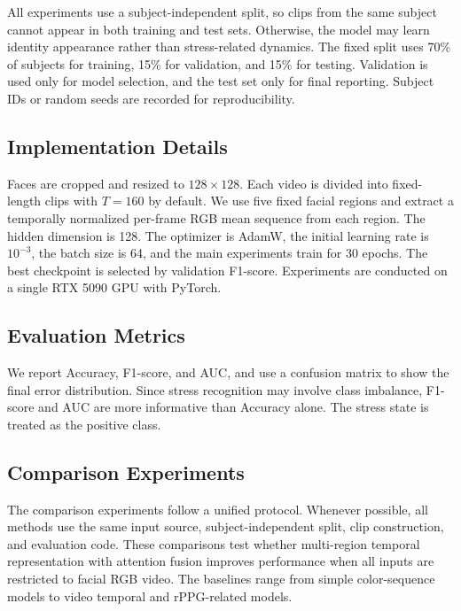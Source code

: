 \documentclass[runningheads]{llncs}
\begin{document}
All experiments use a subject-independent split, so clips from the same subject cannot appear in both training and test sets. Otherwise, the model may learn identity appearance rather than stress-related dynamics. The fixed split uses 70\% of subjects for training, 15\% for validation, and 15\% for testing. Validation is used only for model selection, and the test set only for final reporting. Subject IDs or random seeds are recorded for reproducibility.

\subsection{Implementation Details}

Faces are cropped and resized to $128 \times 128$. Each video is divided into fixed-length clips with $T=160$ by default. We use five fixed facial regions and extract a temporally normalized per-frame RGB mean sequence from each region. The hidden dimension is 128. The optimizer is AdamW, the initial learning rate is $10^{-3}$, the batch size is 64, and the main experiments train for 30 epochs. The best checkpoint is selected by validation F1-score. Experiments are conducted on a single RTX 5090 GPU with PyTorch.

\subsection{Evaluation Metrics}

We report Accuracy, F1-score, and AUC, and use a confusion matrix to show the final error distribution. Since stress recognition may involve class imbalance, F1-score and AUC are more informative than Accuracy alone. The stress state is treated as the positive class.

\subsection{Comparison Experiments}

The comparison experiments follow a unified protocol. Whenever possible, all methods use the same input source, subject-independent split, clip construction, and evaluation code. These comparisons test whether multi-region temporal representation with attention fusion improves performance when all inputs are restricted to facial RGB video. The baselines range from simple color-sequence models to video temporal and rPPG-related models.
\end{document}
